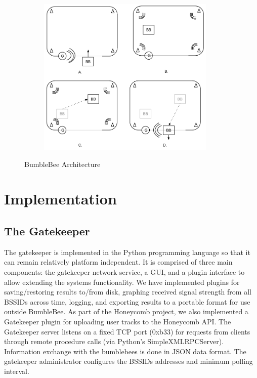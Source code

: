 \begin{figure}[htb] %
	\begin{center}
		\ \includegraphics[width=4in,height=3in]{BumbleBeeExample.png}
		\caption{BumbleBee Architecture}
		\label{bumblebeearch}
	\end{center}
\end{figure}


\section{Implementation}
%


\subsection{The Gatekeeper}
%

The gatekeeper is implemented in the Python programming language so that it can remain relatively platform independent. It is comprised of three main components: the gatekeeper network service, a GUI, and a plugin interface to allow extending the systems functionality. We have implemented plugins for saving/restoring results to/from disk, graphing received signal strength from all BSSIDs across time, logging, and exporting results to a portable format for use outside BumbleBee. As part of the Honeycomb project, we also implemented a Gatekeeper plugin for uploading user tracks to the Honeycomb API. The Gatekeeper server listens on a fixed TCP port (0xb33) for requests from clients through remote procedure calls (via Python’s SimpleXMLRPCServer). Information exchange with the bumblebees is done in JSON \cite{json} data format. The gatekeeper administrator configures the BSSIDs addresses and minimum polling interval.


